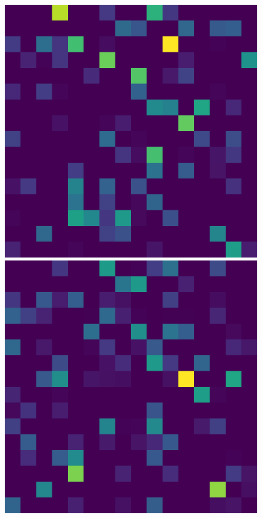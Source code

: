 \begin{figure}[h!]
{	\begin{minipage}[t]{3.5cm}
		\centering
		\includegraphics[width=0.9\linewidth]{figures/result/street/q0_3}
	\end{minipage}
		\begin{minipage}[t]{3.5cm}
			\centering
			\includegraphics[width=0.9\linewidth]{figures/result/street/q0_4}
	\end{minipage}}



\end{figure}
